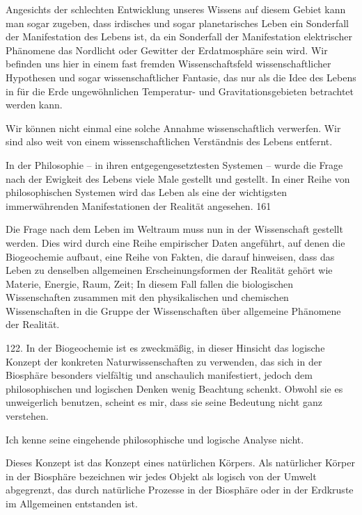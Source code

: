 \documentclass[11pt,a4paper]{book}
\begin{document}
Angesichts der schlechten Entwicklung unseres Wissens auf diesem Gebiet kann man sogar zugeben, dass irdisches und sogar planetarisches Leben ein Sonderfall der Manifestation des Lebens ist, da ein Sonderfall der Manifestation elektrischer Phänomene das Nordlicht oder Gewitter der Erdatmosphäre sein wird. Wir befinden uns hier in einem fast fremden Wissenschaftsfeld wissenschaftlicher Hypothesen und sogar wissenschaftlicher Fantasie, das nur als die Idee des Lebens in für die Erde ungewöhnlichen Temperatur- und Gravitationsgebieten betrachtet werden kann.



Wir können nicht einmal eine solche Annahme wissenschaftlich verwerfen. Wir sind also weit von einem wissenschaftlichen Verständnis des Lebens entfernt.



In der Philosophie -- in ihren entgegengesetztesten Systemen -- wurde die Frage nach der Ewigkeit des Lebens viele Male gestellt und gestellt. In einer Reihe von philosophischen Systemen wird das Leben als eine der wichtigsten immerwährenden Manifestationen der Realität angesehen. 161



Die Frage nach dem Leben im Weltraum muss nun in der Wissenschaft gestellt werden. Dies wird durch eine Reihe empirischer Daten angeführt, auf denen die Biogeochemie aufbaut, eine Reihe von Fakten, die darauf hinweisen, dass das Leben zu denselben allgemeinen Erscheinungsformen der Realität gehört wie Materie, Energie, Raum, Zeit; In diesem Fall fallen die biologischen Wissenschaften zusammen mit den physikalischen und chemischen Wissenschaften in die Gruppe der Wissenschaften über allgemeine Phänomene der Realität.



122. In der Biogeochemie ist es zweckmäßig, in dieser Hinsicht das logische Konzept der konkreten Naturwissenschaften zu verwenden, das sich in der Biosphäre besonders vielfältig und anschaulich manifestiert, jedoch dem philosophischen und logischen Denken wenig Beachtung schenkt. Obwohl sie es unweigerlich benutzen, scheint es mir, dass sie seine Bedeutung nicht ganz verstehen.



Ich kenne seine eingehende philosophische und logische Analyse nicht.



Dieses Konzept ist das Konzept eines natürlichen Körpers. Als natürlicher Körper in der Biosphäre bezeichnen wir jedes Objekt als logisch von der Umwelt abgegrenzt, das durch natürliche Prozesse in der Biosphäre oder in der Erdkruste im Allgemeinen entstanden ist.
\end{document}
